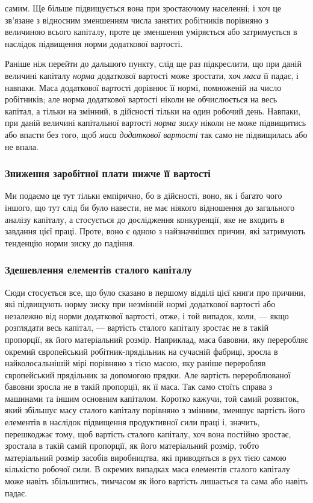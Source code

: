 \parcont{}  %
самим. Ще більше підвищується вона при зростаючому населенні; і хоч це зв’язане з відносним
зменшенням числа занятих робітників порівняно з величиною всього капіталу, проте це зменшення
уміряється або затримується в наслідок підвищення норми додаткової вартості.

Раніше ніж перейти до дальшого пункту, слід ще раз підкреслити, що при даній величині капіталу \emph{норма}
додаткової вартості може зростати, хоч \emph{маса} її падає, і навпаки. Маса додаткової вартості дорівнює
її нормі, помноженій на число робітників; але норма додаткової вартості ніколи не обчислюється на
весь капітал, а тільки на змінний, в дійсності тільки на один робочий день. Навпаки, при даній
величині капітальної вартості \emph{норма зиску} ніколи не може підвищитись або впасти без того, щоб \emph{маса
додаткової вартості} так само не підвищилась або не впала.

\subsubsection{Зниження заробітної плати нижче її вартості}

Ми подаємо це тут тільки емпірично, бо в дійсності, воно, як і багато чого іншого, що тут слід би
було навести, не має ніякого відношення до загального аналізу капіталу, а стосується до дослідження
конкуренції, яке не входить в завдання цієї праці. Проте, воно є одною з найзначніших причин, які
затримують тенденцію норми зиску до падіння.

\subsubsection{Здешевлення елементів сталого капіталу}

Сюди стосується все, що було сказано в першому відділі цієї книги про причини, які підвищують норму
зиску при незмінній нормі додаткової вартості або незалежно від норми додаткової вартості, отже, і
той випадок, коли, — якщо розглядати весь капітал, — вартість сталого капіталу зростає не в такій
пропорції, як його матеріальний розмір. Наприклад, маса бавовни, яку переробляє окремий європейський
робітник-прядільник на сучасній фабриці, зросла в найколосальнішій мірі порівняно з тією масою, яку
раніше переробляв європейський прядільник за допомогою прядки. Але вартість перероблюваної бавовни
зросла не в такій пропорції, як її маса. Так само стоїть справа
з машинами та іншим основним капіталом. Коротко кажучи, той самий розвиток, який збільшує масу
сталого капіталу порівняно з змінним, зменшує вартість його елементів в наслідок підвищення
продуктивної сили праці і, значить, перешкоджає тому, щоб вартість сталого капіталу, хоч вона
постійно зростає, зростала в такій самій пропорції, як його матеріальний розмір, тобто матеріальний
розмір засобів виробництва, які приводяться в рух тією самою кількістю робочої сили. В окремих
випадках маса елементів сталого капіталу може навіть збільшитись, тимчасом як його вартість
лишається та сама або навіть падає.
